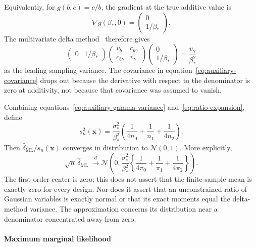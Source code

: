 \documentclass[11pt]{article}
\newcommand{\Normal}{\mathcal{N}}
\begin{document}
Equivalently, for $g(b,c)=c/b$, the gradient at the true additive
value is
\begin{equation}
\nabla g(\beta_*,0)=\begin{pmatrix}0\\1/\beta_*\end{pmatrix}.
\end{equation}
The multivariate delta method~\cite{oehlert1992delta} therefore gives
\begin{equation}
\begin{pmatrix}0&1/\beta_*\end{pmatrix}
\begin{pmatrix}v_b&c_{b\gamma}\\c_{b\gamma}&v_\gamma\end{pmatrix}
\begin{pmatrix}0\\1/\beta_*\end{pmatrix}
=\frac{v_\gamma}{\beta_*^2}
\label{eq:delta-gradient-variance}
\end{equation}
as the leading sampling variance. The covariance in
equation~\eqref{eq:auxiliary-covariance} drops out because the
derivative with respect to the denominator is zero at additivity,
not because that covariance was assumed to vanish.

Combining equations~\eqref{eq:auxiliary-gamma-variance}
and~\eqref{eq:ratio-expansion}, define
\begin{equation}
s_n^2(\mathbf x)=\frac{\sigma_*^2}{\beta_*^2}
 \left(\frac1{4n_0}+\frac1{n_1}+\frac1{4n_2}\right).
\label{eq:slider-null-variance}
\end{equation}
Then $\widehat\delta_{\mathrm{ML}}/s_n(\mathbf x)$ converges in
distribution to $\Normal(0,1)$. More explicitly,
\begin{equation}
\sqrt n\,\widehat\delta_{\mathrm{ML}}
\ \xrightarrow{\ d\ }
\Normal\!\left(0,\frac{\sigma_*^2}{\beta_*^2}
 \left\{\frac1{4\pi_0}+\frac1{\pi_1}+\frac1{4\pi_2}\right\}\right).
\label{eq:slider-ml-limit}
\end{equation}
The first-order center is zero; this does not assert that the
finite-sample mean is exactly zero for every design. Nor does it
assert that an unconstrained ratio of Gaussian variables is exactly
normal or that its exact moments equal the delta-method variance.
The approximation concerns its distribution near a denominator
concentrated away from zero.

\paragraph{Maximum marginal likelihood}
\end{document}
